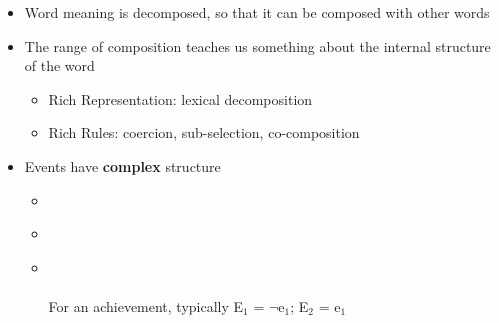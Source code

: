 \documentclass[headrule,footrule]{foils}
\begin{document}
\begin{itemize}
\item Word meaning is decomposed, so that it can be composed with other words
\item The range of composition teaches us something about the internal
  structure of the word
  \begin{itemize}
  \item Rich Representation: lexical decomposition
  \item Rich Rules: coercion, sub-selection, co-composition
  \end{itemize}

\end{itemize}


\begin{itemize}
\item Events have \textbf{complex} structure
  \begin{itemize}
  \item {} 
    \begin{tree}
    \end{tree}
    \\[1ex]    
  \item {}
    \begin{tree}
    \end{tree}
    \\[1ex]     
  \item {}
    \begin{tree}
    \end{tree}
    \\[1ex]     
    \\ For an achievement, typically  E$_1$ = $\neg$e$_1$; E$_2$ = e$_1$
  \end{itemize}
\end{itemize}

  \begin{exe}
    \ex {}
   \begin{tree}
    \end{tree}
    \ex {}
    \begin{tree}
    \end{tree}
    \ex {}
   \begin{tree}
    \end{tree}
  \end{exe}
\end{document}
